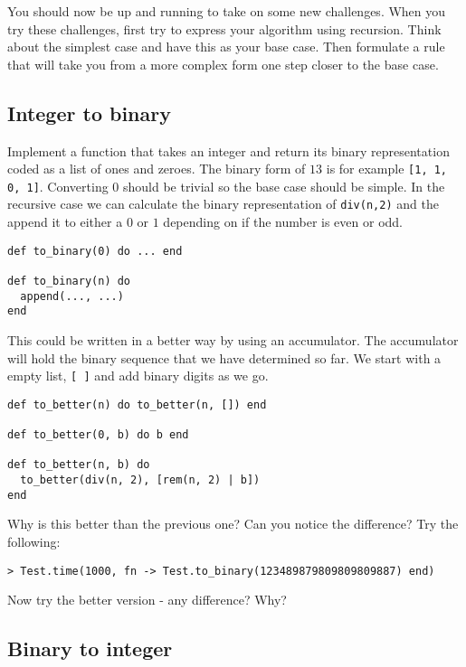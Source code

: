 \documentclass[a4paper,11pt]{article}
\begin{document}
You should now be up and running to take on some new challenges. When
you try these challenges, first try to express your algorithm using
recursion. Think about the simplest case and have this as your base
case. Then formulate a rule that will take you from a more complex form
one step closer to the base case.

\subsection{Integer to binary}

Implement a function that takes an integer and return its binary
representation coded as a list of ones and zeroes. The binary form of
$13$ is for example {\tt [1, 1, 0, 1]}. Converting $0$ should be trivial
so the base case should be simple. In the recursive case we can
calculate the binary representation of {\tt div(n,2)} and the append
it to either a $0$ or $1$ depending on if the number is even or odd.

\begin{verbatim}
def to_binary(0) do ... end

def to_binary(n) do
  append(..., ...)
end
\end{verbatim}

This could be written in a better way by using an accumulator. The
accumulator will hold the binary sequence that we have determined so
far. We start with a empty list, {\tt [ ]} and add binary digits as we go.

\begin{verbatim}
def to_better(n) do to_better(n, []) end

def to_better(0, b) do b end

def to_better(n, b) do
  to_better(div(n, 2), [rem(n, 2) | b])
end
\end{verbatim}

Why is this better than the previous one? Can you notice the difference?  Try the following:

\begin{verbatim}
> Test.time(1000, fn -> Test.to_binary(123489879809809809887) end)
\end{verbatim}

Now try the better version - any difference? Why?

\subsection{Binary to integer}
\end{document}
